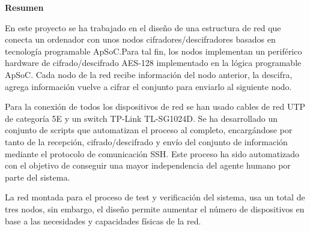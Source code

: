 \begin{center}
	\bigskip
	\bigskip
	\textbf{\huge {Resumen}}\\
	\bigskip
\end{center}

	En este proyecto se ha trabajado en el diseño de una estructura de red que conecta un ordenador con unos nodos cifradores/descifradores basados en tecnología programable ApSoC.Para tal fin, los nodos implementan un periférico hardware de cifrado/descifrado AES-128 implementado en la lógica programable ApSoC. Cada nodo de la red recibe información del nodo anterior, la descifra, agrega información  vuelve a cifrar el conjunto para enviarlo al siguiente nodo.
	
	Para la conexión de todos los dispositivos de red se han usado cables de red UTP de categoría 5E y un switch TP-Link TL-SG1024D. Se ha desarrollado un conjunto de scripts que automatizan el proceso al completo, encargándose por tanto de la recepción, cifrado/descifrado y envío del conjunto de información mediante el protocolo de comunicación SSH. Este proceso ha sido automatizado con el objetivo de conseguir una mayor independencia del agente humano por parte del sistema.
	
	La red montada para el proceso de test y verificación del sistema, usa un total de tres nodos, sin embargo, el diseño permite aumentar el número de dispositivos en base a las necesidades y capacidades físicas de la red.